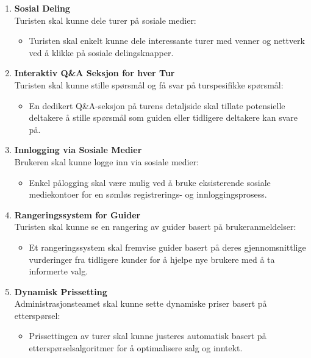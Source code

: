 \documentclass[../doc.tex]{subfiles}
\begin{document}
\begin{enumerate}
    \item \textbf{Sosial Deling} \\
    Turisten skal kunne dele turer på sosiale medier:
    \begin{itemize}
        \item Turisten skal enkelt kunne dele interessante turer med venner og nettverk ved å klikke på sosiale delingsknapper.
    \end{itemize}

    \item \textbf{Interaktiv Q\&A Seksjon for hver Tur} \\
    Turisten skal kunne stille spørsmål og få svar på turspesifikke spørsmål:
    \begin{itemize}
        \item En dedikert Q\&A-seksjon på turens detaljside skal tillate potensielle deltakere å stille spørsmål som guiden eller tidligere deltakere kan svare på.
    \end{itemize}

    \item \textbf{Innlogging via Sosiale Medier} \\
    Brukeren skal kunne logge inn via sosiale medier:
    \begin{itemize}
        \item Enkel pålogging skal være mulig ved å bruke eksisterende sosiale mediekontoer for en sømløs registrerings- og innloggingsprosess.
    \end{itemize}

    \item \textbf{Rangeringssystem for Guider} \\
    Turisten skal kunne se en rangering av guider basert på brukeranmeldelser:
    \begin{itemize}
        \item Et rangeringssystem skal fremvise guider basert på deres gjennomsnittlige vurderinger fra tidligere kunder for å hjelpe nye brukere med å ta informerte valg.
    \end{itemize}

    \item \textbf{Dynamisk Prissetting} \\
    Administrasjonsteamet skal kunne sette dynamiske priser basert på etterspørsel:
    \begin{itemize}
        \item Prissettingen av turer skal kunne justeres automatisk basert på etterspørselsalgoritmer for å optimalisere salg og inntekt.
    \end{itemize}
\end{enumerate}
\end{document}
